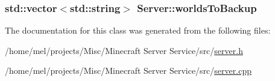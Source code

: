 \subsubsection[{\texorpdfstring{worlds\+To\+Backup}{worldsToBackup}}]{\setlength{\rightskip}{0pt plus 5cm}std\+::vector$<$std\+::string$>$ Server\+::worlds\+To\+Backup\hspace{0.3cm}{\ttfamily [protected]}}\hypertarget{class_server_ac0981101c974ac4173f98c3d2b9adc20}{}\label{class_server_ac0981101c974ac4173f98c3d2b9adc20}


The documentation for this class was generated from the following files\+:\begin{DoxyCompactItemize}
\item 
/home/mel/projects/\+Misc/\+Minecraft Server Service/src/\hyperlink{server_8h}{server.\+h}\item 
/home/mel/projects/\+Misc/\+Minecraft Server Service/src/\hyperlink{server_8cpp}{server.\+cpp}\end{DoxyCompactItemize}
